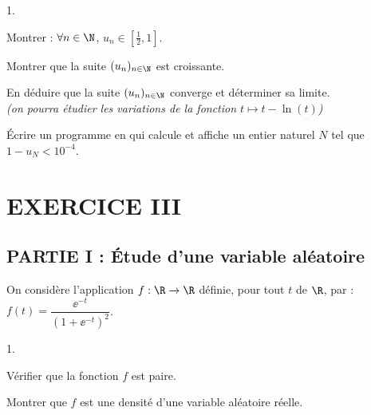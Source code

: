\documentclass[11pt]{article}%
\begin{document}
\begin{noliste}{1.}
\setlength{\itemsep}{2mm}
\setcounter{enumi}{8}
\item Montrer : $\forall n\in \N$, $u_n \in \left[\frac{1}{2},
    1\right]$.

  

\item Montrer que la suite $(u_n)_{n\in \N}$ est croissante.

  

\item En déduire que la suite $(u_n)_{n\in \N}$ converge et déterminer
  sa limite.\\
  {\it (on pourra étudier les variations de la fonction $t\mapsto
    t-\ln(t)$)}



\item Écrire un programme en \Scilab{} qui calcule et affiche un entier 
naturel $N$ tel que $1-u_N<10^{-4}$.



\end{noliste}


\section*{EXERCICE III}


\subsection*{PARTIE I : Étude d'une variable aléatoire}

\noindent
On considère l'application $f:\R\rightarrow\R$ définie, 
pour tout $t$ de $\R$, par : 
$f(t)=\dfrac{\ee^{-t}}{(1+\ee^{-t})^2}$.

\begin{noliste}{1.}
\setlength{\itemsep}{2mm}
\item Vérifier que la fonction $f$ est paire.








\item Montrer que  $f$ est une densité d'une variable aléatoire réelle.



\end{noliste}
\end{document}
